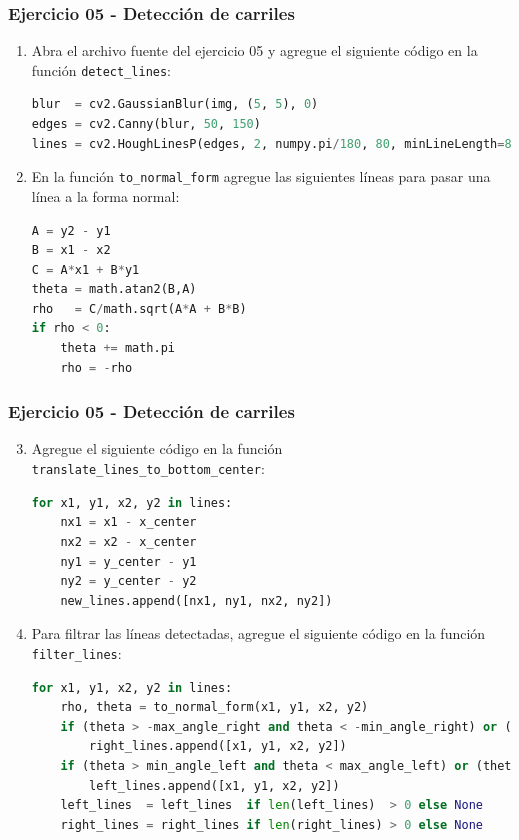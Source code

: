 \begin{frame}[containsverbatim]\frametitle{Ejercicio 05 - Detección de carriles}
  \begin{enumerate}
  \item Abra el archivo fuente del ejercicio 05 y agregue el siguiente código en la función \texttt{detect\_lines}:
    \begin{lstlisting}[language=Python,firstnumber=24]
blur  = cv2.GaussianBlur(img, (5, 5), 0)
edges = cv2.Canny(blur, 50, 150)
lines = cv2.HoughLinesP(edges, 2, numpy.pi/180, 80, minLineLength=80, maxLineGap=100)[:,0]    
    \end{lstlisting}
  \item En la función \texttt{to\_normal\_form} agregue las siguientes líneas para pasar una línea a la forma normal:
    \begin{lstlisting}[language=Python,firstnumber=36]
A = y2 - y1
B = x1 - x2
C = A*x1 + B*y1
theta = math.atan2(B,A)
rho   = C/math.sqrt(A*A + B*B)
if rho < 0:
    theta += math.pi
    rho = -rho  
    \end{lstlisting}
  \end{enumerate}  
\end{frame}

\begin{frame}[containsverbatim]\frametitle{Ejercicio 05 - Detección de carriles}
  \begin{enumerate}
    \setcounter{enumi}{2}
  \item Agregue el siguiente código en la función \texttt{translate\_lines\_to\_bottom\_center}:
    \begin{lstlisting}[language=Python,firstnumber=55]
for x1, y1, x2, y2 in lines:
    nx1 = x1 - x_center
    nx2 = x2 - x_center
    ny1 = y_center - y1
    ny2 = y_center - y2
    new_lines.append([nx1, ny1, nx2, ny2])
    \end{lstlisting}
  \item Para filtrar las líneas detectadas, agregue el siguiente código en la función \texttt{filter\_lines}:
    \begin{lstlisting}[language=Python,firstnumber=80]
for x1, y1, x2, y2 in lines:
    rho, theta = to_normal_form(x1, y1, x2, y2)
    if (theta > -max_angle_right and theta < -min_angle_right) or (theta > min_angle_right and theta < max_angle_right):
        right_lines.append([x1, y1, x2, y2])
    if (theta > min_angle_left and theta < max_angle_left) or (theta > -max_angle_left and theta < -max_angle_left):
        left_lines.append([x1, y1, x2, y2])
    left_lines  = left_lines  if len(left_lines)  > 0 else None
    right_lines = right_lines if len(right_lines) > 0 else None
    \end{lstlisting}
  \end{enumerate}
\end{frame}


